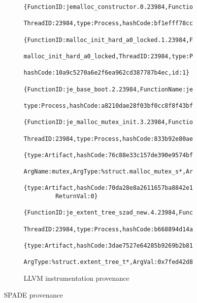 \begin{figure}[t]
  \begin{subfigure}[b]{\columnwidth}
    {
      \scriptsize
      \begin{Verbatim}[gobble=8]
        {FunctionID:jemalloc_constructor.0.23984,FunctionName:jemalloc_constructor,
         ThreadID:23984,type:Process,hashCode:bf1efff78cc36fca4e34ba0b7bdea49d,id:0}
        {FunctionID:malloc_init_hard_a0_locked.1.23984,FunctionName:
         malloc_init_hard_a0_locked,ThreadID:23984,type:Process,
         hashCode:10a9c5270a6e2f6ea962cd387787b4ec,id:1}
        {FunctionID:je_base_boot.2.23984,FunctionName:je_base_boot,ThreadID:23984,
         type:Process,hashCode:a8210dae28f03bf0cc8f8f43bff1b0ec,id:2}
        {FunctionID:je_malloc_mutex_init.3.23984,FunctionName:je_malloc_mutex_init,
         ThreadID:23984,type:Process,hashCode:833b92e80ae64062350b522d285a08b6,id:3}
        {type:Artifact,hashCode:76c88e33c157de390e9574bf0196b3de,id:4,
         ArgName:mutex,ArgType:%struct.malloc_mutex_s*,ArgVal:0x7fed42d84520}
        {type:Artifact,hashCode:70da28e8a2611657ba8842e198f401db,id:5,ReturnType:i1,
         ReturnVal:0}
        {FunctionID:je_extent_tree_szad_new.4.23984,FunctionName:je_extent_tree_szad_new,
         ThreadID:23984,type:Process,hashCode:b668894d14a1e0f73b5a45ea39208e9f,id:6}
        {type:Artifact,hashCode:3dae7527e64285b9269b2b81a3c3ca9c,id:7,ArgName:rbtree,
         ArgType:%struct.extent_tree_t*,ArgVal:0x7fed42d84548}
      \end{Verbatim}
    }
    \caption{LLVM instrumentation provenance}
  \end{subfigure}
  \caption{SPADE provenance}
\end{figure}
